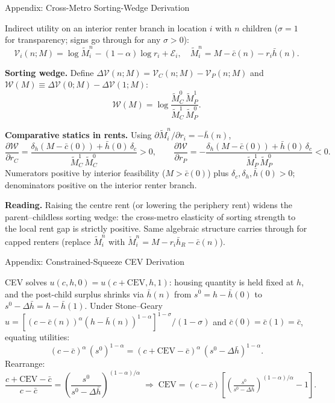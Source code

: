 \documentclass[11pt,aspectratio=169]{beamer}
\begin{document}
\begin{frame}{Appendix: Cross-Metro Sorting-Wedge Derivation \; \hyperlink{slide2-main}{}}
\label{app:wealth}
\footnotesize

Indirect utility on an interior renter branch in location $i$ with $n$ children ($\sigma=1$ for transparency; signs go through for any $\sigma > 0$):
\[
\mathcal V_i(n;M) = \log \tilde M_i^n - (1-\alpha)\log r_i + \mathcal E_i,
\quad
\tilde M_i^n = M - \bar c(n) - r_i \bar h(n).
\]

\vspace{0.4em}
\textbf{Sorting wedge.} Define
$\Delta\mathcal V(n;M)=\mathcal V_C(n;M)-\mathcal V_P(n;M)$ and
$\mathcal W(M)\equiv\Delta\mathcal V(0;M)-\Delta\mathcal V(1;M)$:
\[
\mathcal W(M) = \log\frac{\tilde M_C^0\,\tilde M_P^1}{\tilde M_C^1\,\tilde M_P^0}.
\]

\vspace{0.4em}
\textbf{Comparative statics in rents.} Using $\partial \tilde M_i^n/\partial r_i = -\bar h(n)$,
\[
\frac{\partial \mathcal W}{\partial r_C}
= \frac{\delta_h(M-\bar c(0)) + \bar h(0)\,\delta_c}{\tilde M_C^1\,\tilde M_C^0} > 0,
\qquad
\frac{\partial \mathcal W}{\partial r_P}
= -\frac{\delta_h(M-\bar c(0)) + \bar h(0)\,\delta_c}{\tilde M_P^1\,\tilde M_P^0} < 0.
\]
Numerators positive by interior feasibility ($M > \bar c(0)$) plus $\delta_c, \delta_h, \bar h(0) > 0$; denominators positive on the interior renter branch.

\vspace{0.4em}
\textbf{Reading.} Raising the centre rent (or lowering the periphery rent) widens the parent--childless sorting wedge: the cross-metro elasticity of sorting strength to the local rent gap is strictly positive. Same algebraic structure carries through for capped renters (replace $\tilde M_i^n$ with $\check M_i^n = M - r_i \bar h_R - \bar c(n)$).
\end{frame}

\begin{frame}{Appendix: Constrained-Squeeze CEV Derivation \; \hyperlink{lem3-main}{}}
\label{app:lem3-cev}
\small

	CEV solves $u(c,h,0) = u(c+\mathrm{CEV}, h, 1)$: housing quantity is
	held fixed at $h$, and the post-child surplus shrinks via
	$\bar h(n)$ from $s^0 = h - \bar h(0)$ to
	$s^0-\Delta\bar h = h - \bar h(1)$.
Under Stone--Geary
$u = [(c-\bar c(n))^\alpha(h-\bar h(n))^{1-\alpha}]^{1-\sigma}/(1-\sigma)$
and $\bar c(0) = \bar c(1) = \bar c$, equating utilities:
\[
(c - \bar c)^\alpha\, (s^0)^{1-\alpha}
	= (c + \mathrm{CEV} - \bar c)^\alpha\, (s^0-\Delta\bar h)^{1-\alpha}.
\]
Rearrange:
\[
\frac{c + \mathrm{CEV} - \bar c}{c - \bar c}
	= \left(\frac{s^0}{s^0-\Delta\bar h}\right)^{\!(1-\alpha)/\alpha}
	\;\Longrightarrow\;
	\mathrm{CEV} = (c - \bar c)\!\left[\!\left(\tfrac{s^0}{s^0-\Delta\bar h}\right)^{\!(1-\alpha)/\alpha}\!\!-1\right].
\]

\end{frame}
\end{document}
